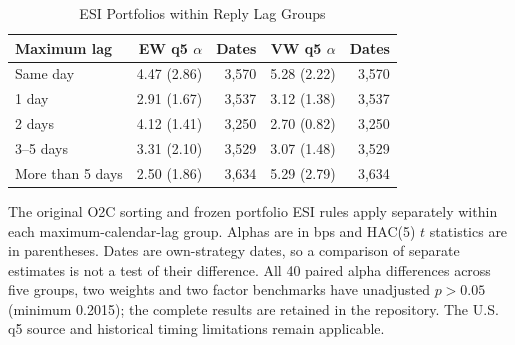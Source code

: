 \begin{table}[H]
\centering\footnotesize
\caption{ESI Portfolios within Reply Lag Groups}\label{tab:lag_portfolios}
\begin{threeparttable}
\renewcommand{\arraystretch}{1.12}
\begin{tabular*}{\textwidth}{@{\extracolsep{\fill}}lrrrr@{}}
\toprule
Maximum lag & EW q5 $\alpha$ & Dates & VW q5 $\alpha$ & Dates \\
\midrule
Same day & 4.47 (2.86) & 3,570 & 5.28 (2.22) & 3,570 \\
1 day & 2.91 (1.67) & 3,537 & 3.12 (1.38) & 3,537 \\
2 days & 4.12 (1.41) & 3,250 & 2.70 (0.82) & 3,250 \\
3--5 days & 3.31 (2.10) & 3,529 & 3.07 (1.48) & 3,529 \\
More than 5 days & 2.50 (1.86) & 3,634 & 5.29 (2.79) & 3,634 \\
\bottomrule
\end{tabular*}
\begin{tablenoteblock}
The original O2C sorting and frozen portfolio ESI rules apply separately within each maximum-calendar-lag group. Alphas are in bps and HAC(5) $t$ statistics are in parentheses. Dates are own-strategy dates, so a comparison of separate estimates is not a test of their difference. All 40 paired alpha differences across five groups, two weights and two factor benchmarks have unadjusted $p>0.05$ (minimum 0.2015); the complete results are retained in the repository. The U.S. q5 source and historical timing limitations remain applicable.
\end{tablenoteblock}
\end{threeparttable}
\end{table}

